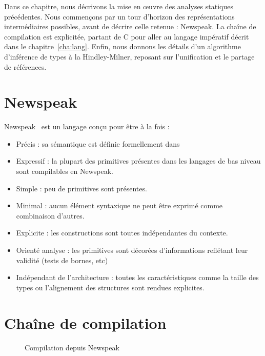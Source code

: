 Dans ce chapitre, nous décrivons la mise en œuvre des analyses statiques
précédentes. Nous commençons par un tour d'horizon des représentations
intermédiaires possibles, avant de décrire celle retenue : Newspeak. La chaîne
de compilation est explicitée, partant de C pour aller au langage impératif
décrit dans le chapitre~\ref{cha:lang}. Enfin, nous donnons les détails d'un
algorithme d'inférence de types à la Hindley-Milner, reposant sur l'unification
et le partage de références.

\section{Newspeak}
\label{sec:npk}

Newspeak~\cite{newspeak} est un langage conçu pour être à la fois :

\begin{itemize}
  \item Précis : sa sémantique est définie formellement dans~\cite{newspeak}
  \item Expressif : la plupart des primitives présentes dans les
    langages de bas niveau sont compilables en Newspeak.
  \item Simple : peu de primitives sont présentes.
  \item Minimal : aucun élément syntaxique ne peut être exprimé
    comme combinaison d'autres.
  \item Explicite : les constructions sont toutes indépendantes du
    contexte.
  \item Orienté analyse : les primitives sont décorées d'informations
    reflétant leur validité (tests de bornes, etc)
  \item Indépendant de l'architecture : toutes les caractéristiques comme
    la taille des types ou l'alignement des structures sont rendues explicites.
\end{itemize}


\wip{}

\section{Chaîne de compilation}

\begin{figure}
  \centering
  
  \caption{Compilation depuis Newspeak}
  \label{fig:compil-npk}
\end{figure}

